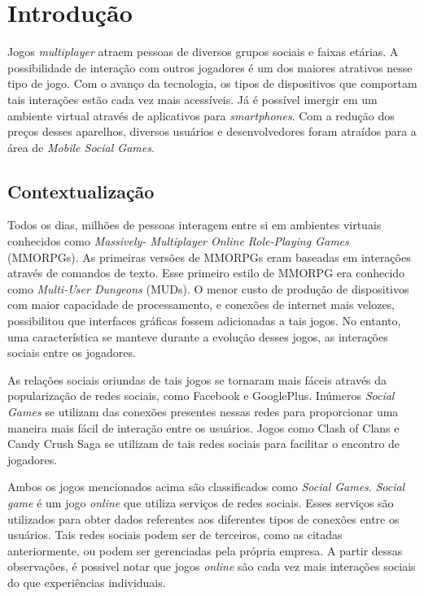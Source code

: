 \chapter[Introdução]{Introdução}

Jogos \textit{multiplayer} atraem pessoas de diversos grupos sociais e faixas etárias. A possibilidade de interação com outros jogadores
é um dos maiores atrativos nesse tipo de jogo. Com o avanço da tecnologia, os tipos de dispositivos que comportam tais interações
estão cada vez mais acessíveis. Já é possível imergir em um ambiente virtual através de aplicativos para \textit{smartphones}. Com a
redução dos preços desses aparelhos, diversos usuários e desenvolvedores foram atraídos para a área de \textit{Mobile Social Games}.

\section{Contextualização}

Todos os dias, milhões de pessoas interagem entre si em ambientes virtuais conhecidos como
\textit{Massively- Multiplayer Online Role-Playing Games} (MMORPGs)\cite{nick2006}. As primeiras versões de MMORPGs eram baseadas em
interações através de comandos de texto. Esse primeiro estilo de MMORPG era conhecido como \textit{Multi-User Dungeons} (MUDs)\cite{edward1997}.
O menor custo de produção de dispositivos com maior capacidade de processamento, e conexões de internet mais velozes,
possibilitou que interfaces gráficas fossem adicionadas a tais jogos. No entanto, uma característica se manteve durante a evolução desses jogos,
as interações sociais entre os jogadores.

As relações sociais oriundas de tais jogos se tornaram mais fáceis através da popularização de redes sociais, como Facebook e GooglePlus.
Inúmeros \textit{Social Games} se utilizam das conexões presentes nessas redes para proporcionar uma maneira mais fácil de interação entre
os usuários. Jogos como Clash of Clans\cite{clashOfClans} e Candy Crush Saga\cite{candyCrush} se utilizam de tais redes sociais para facilitar
o encontro de jogadores.

Ambos os jogos mencionados acima são classificados como \textit{Social Games}. \textit{Social game} é um jogo \textit{online} que utiliza servi\c{c}os de redes sociais\cite{park2012}.
Esses serviços são utilizados para obter dados referentes aos diferentes tipos de conexões entre os usuários. Tais redes sociais podem ser de terceiros,
como as citadas anteriormente, ou podem ser gerenciadas pela própria empresa. A partir dessas observações, é possivel notar que
jogos \textit{online} são cada vez mais interações sociais do que experi\^encias individuais\cite{king2003}.

